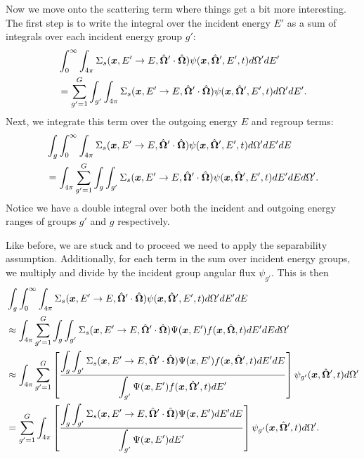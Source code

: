 Now we move onto the scattering term where things get a bit more interesting. The first step is to write the integral over the incident energy $E'$ as a sum of integrals over each incident energy group $g'$:
\begin{align}
  &\int_0^\infty \int_{4\pi} \Sigma_s( \bm{x}, E' \rightarrow E, \hat{\mathbf{\Omega}}' \cdot \hat{\mathbf{\Omega}} ) \psi( \bm{x}, \hat{\mathbf{\Omega}}', E',t ) d\Omega' dE' \nonumber \\
  &= \sum_{g'=1}^G \int_{g'} \int_{4\pi} \Sigma_s( \bm{x}, E' \rightarrow E, \hat{\mathbf{\Omega}}' \cdot \hat{\mathbf{\Omega}} ) \psi( \bm{x}, \hat{\mathbf{\Omega}}', E',t ) d\Omega' dE' . \nonumber
\end{align}
Next, we integrate this term over the outgoing energy $E$ and regroup terms:
\begin{align}
  &\int_g \int_0^\infty \int_{4\pi} \Sigma_s( \bm{x}, E' \rightarrow E, \hat{\mathbf{\Omega}}' \cdot \hat{\mathbf{\Omega}} ) \psi( \bm{x}, \hat{\mathbf{\Omega}}', E',t ) d\Omega' dE' dE \nonumber \\
  &= \int_{4\pi} \sum_{g'=1}^G \int_g \int_{g'} \Sigma_s( \bm{x}, E' \rightarrow E, \hat{\mathbf{\Omega}}' \cdot \hat{\mathbf{\Omega}} ) \psi( \bm{x}, \hat{\mathbf{\Omega}}', E',t ) dE' dE d\Omega' . \nonumber
\end{align}
Notice we have a double integral over both the incident and outgoing energy ranges of groups $g'$ and $g$ respectively. 

Like before, we are stuck and to proceed we need to apply the separability assumption. Additionally, for each term in the sum over incident energy groups, we multiply and divide by the incident group angular flux $\psi_{g'}$. This is then
\begin{align}
  &\int_g \int_0^\infty \int_{4\pi} \Sigma_s( \bm{x}, E' \rightarrow E, \hat{\mathbf{\Omega}}' \cdot \hat{\mathbf{\Omega}} ) \psi( \bm{x}, \hat{\mathbf{\Omega}}', E',t ) d\Omega' dE' dE \nonumber \\
  &\approx \int_{4\pi} \sum_{g'=1}^G \int_g \int_{g'} \Sigma_s( \bm{x}, E' \rightarrow E, \hat{\mathbf{\Omega}}' \cdot \hat{\mathbf{\Omega}} ) \Psi(\bm{x},E') f(\bm{x},\hat{\mathbf{\Omega}},t) dE' dE d\Omega' \nonumber \\
  &\approx \int_{4\pi} \sum_{g'=1}^G \left[ \dfrac{ \displaystyle\int_g \int_{g'} \Sigma_s( \bm{x}, E' \rightarrow E, \hat{\mathbf{\Omega}}' \cdot \hat{\mathbf{\Omega}} ) \Psi(\bm{x},E') f(\bm{x},\hat{\mathbf{\Omega}}',t) dE' dE }{ \displaystyle\int_{g'} \Psi(\bm{x},E') f(\bm{x},\hat{\mathbf{\Omega}}',t) dE' } \right] \psi_{g'}(\bm{x},\hat{\mathbf{\Omega}}',t)  d\Omega' \nonumber \\
  &= \sum_{g'=1}^G  \int_{4\pi} \left[ \dfrac{ \displaystyle\int_g \int_{g'} \Sigma_s( \bm{x}, E' \rightarrow E, \hat{\mathbf{\Omega}}' \cdot \hat{\mathbf{\Omega}} ) \Psi(\bm{x},E') dE' dE }{ \displaystyle\int_{g'} \Psi(\bm{x},E') dE' } \right] \psi_{g'}(\bm{x},\hat{\mathbf{\Omega}}',t)  d\Omega' .
\end{align}

